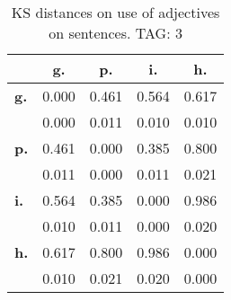 \begin{table}[h!]
\begin{center}
\begin{tabular}{| l || c | c | c | c |}\hline
 & {\bf g.} & {\bf p.} & {\bf i.} & {\bf h.} \\\hline\hline
{\bf g.} & 0.000 & 0.461 & 0.564 & 0.617 \\
{\bf } & 0.000 & 0.011 & 0.010 & 0.010 \\\hline
{\bf p.} & 0.461 & 0.000 & 0.385 & 0.800 \\
{\bf } & 0.011 & 0.000 & 0.011 & 0.021 \\\hline
{\bf i.} & 0.564 & 0.385 & 0.000 & 0.986 \\
{\bf } & 0.010 & 0.011 & 0.000 & 0.020 \\\hline
{\bf h.} & 0.617 & 0.800 & 0.986 & 0.000 \\
{\bf } & 0.010 & 0.021 & 0.020 & 0.000 \\\hline
\end{tabular}
\caption{KS distances on use of adjectives on sentences. TAG: 3}
\end{center}
\end{table}